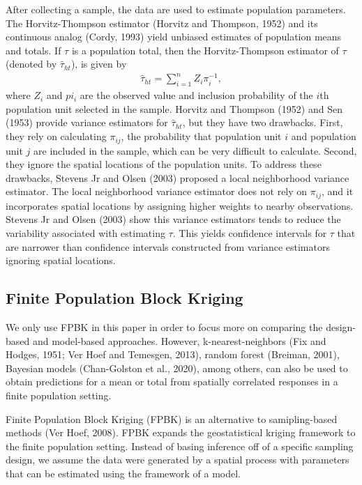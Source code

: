 \documentclass[]{elsarticle} %
\begin{document}
After collecting a sample, the data are used to estimate population
parameters. The Horvitz-Thompson estimator (Horvitz and Thompson, 1952)
and its continuous analog (Cordy, 1993) yield unbiased estimates of
population means and totals. If \(\tau\) is a population total, then the
Horvitz-Thompson estimator of \(\tau\) (denoted by \(\hat{\tau}_{ht}\)),
is given by \begin{align}\label{eq:ht}
  \hat{\tau}_{ht} = \sum_{i = 1}^n Z_i \pi_i^{-1},
\end{align} where \(Z_i\) and \(pi_i\) are the observed value and
inclusion probability of the \(i\)th population unit selected in the
sample. Horvitz and Thompson (1952) and Sen (1953) provide variance
estimators for \(\hat{\tau}_{ht}\), but they have two drawbacks. First,
they rely on calculating \(\pi_{ij}\), the probability that population
unit \(i\) and population unit \(j\) are included in the sample, which
can be very difficult to calculate. Second, they ignore the spatial
locations of the population units. To address these drawbacks, Stevens
Jr and Olsen (2003) proposed a local neighborhood variance estimator.
The local neighborhood variance estimator does not rely on \(\pi_{ij}\),
and it incorporates spatial locations by assigning higher weights to
nearby observations. Stevens Jr and Olsen (2003) show this variance
estimators tends to reduce the variability associated with estimating
\(\tau\). This yields confidence intervals for \(\tau\) that are
narrower than confidence intervals constructed from variance estimators
ignoring spatial locations.

\hypertarget{finite-population-block-kriging}{%
\subsection{Finite Population Block
Kriging}\label{finite-population-block-kriging}}

We only use FPBK in this paper in order to focus more on comparing the
design-based and model-based approaches. However, k-nearest-neighbors
(Fix and Hodges, 1951; Ver Hoef and Temesgen, 2013), random forest
(Breiman, 2001), Bayesian models (Chan-Golston et al., 2020), among
others, can also be used to obtain predictions for a mean or total from
spatially correlated responses in a finite population setting.

Finite Population Block Kriging (FPBK) is an alternative to
samipling-based methods (Ver Hoef, 2008). FPBK expands the
geostatistical kriging framework to the finite population setting.
Instead of basing inference off of a specific sampling design, we assume
the data were generated by a spatial process with parameters that can be
estimated using the framework of a model.
\end{document}
